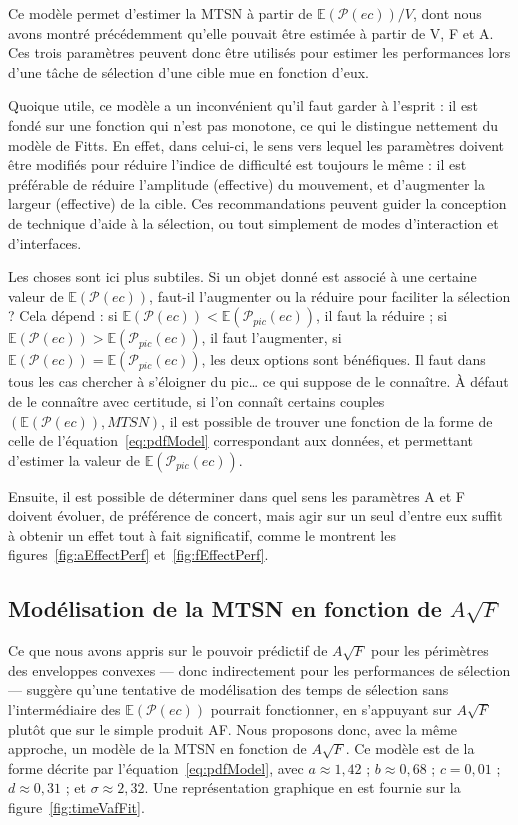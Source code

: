 	Ce modèle permet d'estimer la MTSN à partir de $\mathbb{E}(\mathcal{P}(ec))/V$, dont nous avons montré précédemment qu'elle pouvait être estimée à partir de V, F et A. Ces trois paramètres peuvent donc être utilisés pour estimer les performances lors d'une tâche de sélection d'une cible mue en fonction d'eux.
	
	Quoique utile, ce modèle a un inconvénient qu'il faut garder à l'esprit : il est fondé sur une fonction qui n'est pas monotone, ce qui le distingue nettement du modèle de Fitts. En effet, dans celui-ci, le sens vers lequel les paramètres doivent être modifiés pour réduire l'indice de difficulté est toujours le même : il est préférable de réduire l'amplitude (effective) du mouvement, et d'augmenter la largeur (effective) de la cible. Ces recommandations peuvent guider la conception de technique d'aide à la sélection, ou tout simplement de modes d'interaction et d'interfaces.
	
	Les choses sont ici plus subtiles. Si un objet donné est associé à une certaine valeur de $\mathbb{E}(\mathcal{P}(ec))$, faut-il l'augmenter ou la réduire pour faciliter la sélection ? Cela dépend : si $\mathbb{E}(\mathcal{P}(ec)) < \mathbb{E}(\mathcal{P}_{pic}(ec))$, il faut la réduire ; si $\mathbb{E}(\mathcal{P}(ec)) > \mathbb{E}(\mathcal{P}_{pic}(ec))$, il faut l'augmenter, si $\mathbb{E}(\mathcal{P}(ec)) = \mathbb{E}(\mathcal{P}_{pic}(ec))$, les deux options sont bénéfiques. Il faut dans tous les cas chercher à \og s'éloigner \fg{} du pic\ldots{} ce qui suppose de le connaître. À défaut de le connaître avec certitude, si l'on connaît certains couples $\left( \mathbb{E}(\mathcal{P}(ec)), MTSN\right)$, il est possible de trouver une fonction de la forme de celle de l'équation~\ref{eq:pdfModel} correspondant aux données, et permettant d'estimer la valeur de $\mathbb{E}(\mathcal{P}_{pic}(ec))$.
	
	Ensuite, il est possible de déterminer dans quel sens les paramètres A et F doivent évoluer, de préférence de concert, mais agir sur un seul d'entre eux suffit à obtenir un effet tout à fait significatif, comme le montrent les figures~\ref{fig:aEffectPerf} et~\ref{fig:fEffectPerf}.
	
	\subsection{Modélisation de la MTSN en fonction de \texorpdfstring{$A\sqrt{F}$}{A* racine carrée de F}}
	Ce que nous avons appris sur le pouvoir prédictif de $A\sqrt{F}$ pour les périmètres des enveloppes convexes --- donc indirectement pour les performances de sélection --- suggère qu'une tentative de modélisation des temps de sélection sans l'intermédiaire des $\mathbb{E}(\mathcal{P}(ec))$ pourrait fonctionner, en s'appuyant sur $A\sqrt{F}$ plutôt que sur le simple produit AF. Nous proposons donc, avec la même approche, un modèle de la MTSN en fonction de $A\sqrt{F}$. Ce modèle est de la forme décrite par l'équation~\ref{eq:pdfModel}, avec $a \approx 1,42$ ; $b \approx 0,68$ ; $c = 0,01$ ; $d \approx 0,31$ ; et $\sigma \approx 2,32$. Une représentation graphique en est fournie sur la figure~\ref{fig:timeVafFit}.
	
